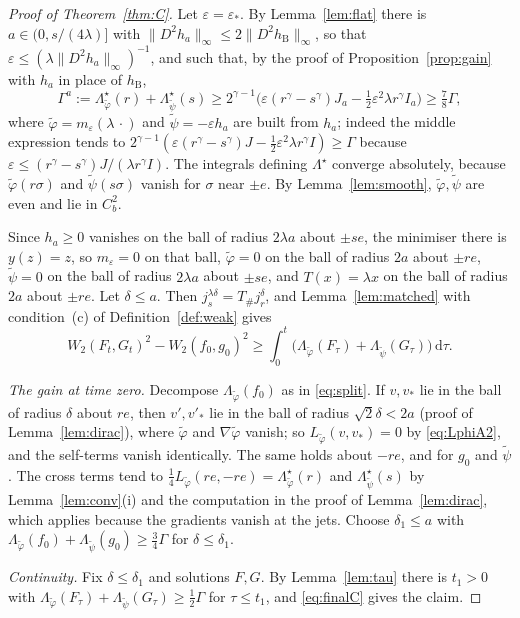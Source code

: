 \documentclass[11pt]{amsart}
\theoremstyle{definition}
\newcommand{\dd}{\,\mathrm{d}}
\newcommand{\hB}{h_{\mathrm B}}
\begin{document}
\begin{proof}[Proof of Theorem~\ref{thm:C}]
Let $\varepsilon=\varepsilon_*$. By Lemma~\ref{lem:flat} there is $a\in(0,s/(4\lambda)]$ with $\|D^2h_a\|_\infty\le2\|D^2\hB\|_\infty$, so that $\varepsilon\le(\lambda\|D^2h_a\|_\infty)^{-1}$, and such that, by the proof of Proposition~\ref{prop:gain} with $h_a$ in place of $\hB$,
\[
\Gamma^a:=\Lambda^\star_{\tilde\varphi}(r)+\Lambda^\star_{\tilde\psi}(s)\ge2^{\gamma-1}\Big(\varepsilon(r^\gamma-s^\gamma)J_a-\tfrac12\varepsilon^2\lambda r^\gamma I_a\Big)\ge\tfrac78\Gamma ,
\]
where $\tilde\varphi=m_\varepsilon(\lambda\,\cdot)$ and $\tilde\psi=-\varepsilon h_a$ are built from $h_a$; indeed the middle expression tends to $2^{\gamma-1}(\varepsilon(r^\gamma-s^\gamma)J-\frac12\varepsilon^2\lambda r^\gamma I)\ge\Gamma$ because $\varepsilon\le(r^\gamma-s^\gamma)J/(\lambda r^\gamma I)$. The integrals defining $\Lambda^\star$ converge absolutely, because $\tilde\varphi(r\sigma)$ and $\tilde\psi(s\sigma)$ vanish for $\sigma$ near $\pm e$. By Lemma~\ref{lem:smooth}, $\tilde\varphi,\tilde\psi$ are even and lie in $C^2_b$.

Since $h_a\ge0$ vanishes on the ball of radius $2\lambda a$ about $\pm se$, the minimiser there is $y(z)=z$, so $m_\varepsilon=0$ on that ball, $\tilde\varphi=0$ on the ball of radius $2a$ about $\pm re$, $\tilde\psi=0$ on the ball of radius $2\lambda a$ about $\pm se$, and $T(x)=\lambda x$ on the ball of radius $2a$ about $\pm re$. Let $\delta\le a$. Then $j^{\lambda\delta}_s=T_\#j^\delta_r$, and Lemma~\ref{lem:matched} with condition~(c) of Definition~\ref{def:weak} gives
\begin{equation}\label{eq:finalC}
W_2(F_t,G_t)^2-W_2(f_0,g_0)^2\ge\int_0^t\big(\Lambda_{\tilde\varphi}(F_\tau)+\Lambda_{\tilde\psi}(G_\tau)\big)\dd\tau .
\end{equation}

\emph{The gain at time zero.} Decompose $\Lambda_{\tilde\varphi}(f_0)$ as in \eqref{eq:split}. If $v,v_*$ lie in the ball of radius $\delta$ about $re$, then $v',v'_*$ lie in the ball of radius $\sqrt2\delta<2a$ (proof of Lemma~\ref{lem:dirac}), where $\tilde\varphi$ and $\nabla\tilde\varphi$ vanish; so $L_{\tilde\varphi}(v,v_*)=0$ by \eqref{eq:LphiA2}, and the self-terms vanish identically. The same holds about $-re$, and for $g_0$ and $\tilde\psi$. The cross terms tend to $\frac14L_{\tilde\varphi}(re,-re)=\Lambda^\star_{\tilde\varphi}(r)$ and $\Lambda^\star_{\tilde\psi}(s)$ by Lemma~\ref{lem:conv}(i) and the computation in the proof of Lemma~\ref{lem:dirac}, which applies because the gradients vanish at the jets. Choose $\delta_1\le a$ with $\Lambda_{\tilde\varphi}(f_0)+\Lambda_{\tilde\psi}(g_0)\ge\frac34\Gamma$ for $\delta\le\delta_1$.

\emph{Continuity.} Fix $\delta\le\delta_1$ and solutions $F,G$. By Lemma~\ref{lem:tau} there is $t_1>0$ with $\Lambda_{\tilde\varphi}(F_\tau)+\Lambda_{\tilde\psi}(G_\tau)\ge\frac12\Gamma$ for $\tau\le t_1$, and \eqref{eq:finalC} gives the claim.
\end{proof}
\end{document}
